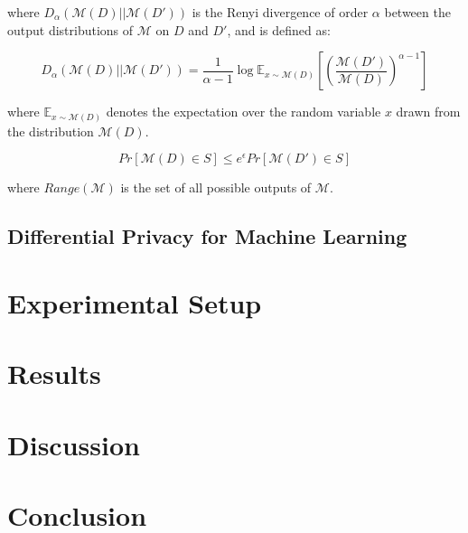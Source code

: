     where $D_{\alpha}(\mathcal{M}(D) || \mathcal{M}(D'))$ is the Renyi divergence of order $\alpha$ between the output distributions of $\mathcal{M}$ on $D$ and $D'$, and is defined as:
    
    \begin{equation}
        D_{\alpha}(\mathcal{M}(D) || \mathcal{M}(D')) = \frac{1}{\alpha - 1} \log \mathbb{E}_{x \sim \mathcal{M}(D)} \left[ \left( \frac{\mathcal{M}(D')}{\mathcal{M}(D)} \right)^{\alpha - 1} \right]
    \end{equation}
        
        where $\mathbb{E}_{x \sim \mathcal{M}(D)}$ denotes the expectation over the random variable $x$ drawn from the distribution $\mathcal{M}(D)$.

        

    
\begin{equation}
    Pr[\mathcal{M}(D) \in S] \leq e^{\epsilon} Pr[\mathcal{M}(D') \in S]
\end{equation}
    
    where $Range(\mathcal{M})$ is the set of all possible outputs of $\mathcal{M}$.





\subsection{Differential Privacy for Machine Learning}
\label{sec:dpml}


\section{Experimental Setup}
\label{sec:exp}


\section{Results}
\label{sec:results}

\section{Discussion}
\label{sec:discussion}

\section{Conclusion}
\label{sec:conclusion}

